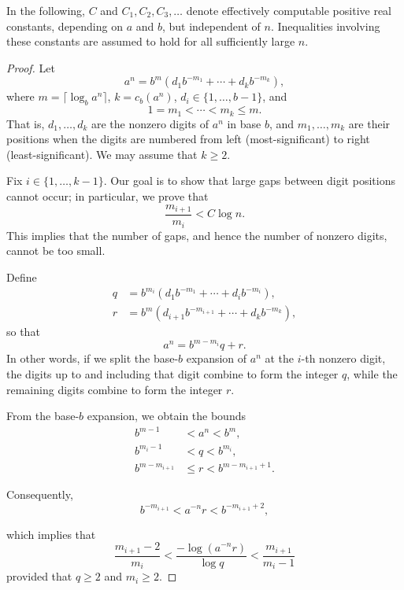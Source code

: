 \documentclass[12pt]{amsart}
\theoremstyle{remark}
\begin{document}
In the following, $C$ and $C_1, C_2, C_3, \ldots$ denote effectively computable positive real constants,
depending on $a$ and $b$, but independent of $n$.
Inequalities involving these constants are assumed to hold for all sufficiently large $n$.

\begin{proof}
    Let
    \[
        a^n = b^m \left(d_1 b^{-m_1} + \cdots + d_k b^{-m_k}\right),
    \]
    where $m = \lceil \log_b a^n \rceil$, $k = c_b(a^n)$,
    $d_i \in \{1, \ldots, b-1\}$,
    and
    \[
        1 = m_1 < \cdots < m_k \le m.
    \]
    That is, $d_1, \ldots, d_k$ are the nonzero digits of $a^n$ in base $b$,
    and $m_1, \ldots, m_k$ are their positions when the digits are numbered
    from left (most-significant) to right (least-significant).
    We may assume that $k \ge 2$.

    Fix $i \in \{1,\dots,k-1\}$.
    Our goal is to show that large gaps between digit positions cannot occur;
    in particular, we prove that
    \[
        \frac{m_{i+1}}{m_i} < C \log n.
    \]
    This implies that the number of gaps,
    and hence the number of nonzero digits, cannot be too small.

    Define
    \begin{align*}\label{ineq:base-b-bounds}
        q & = b^{m_{i}} (d_1 b^{-m_{1}} + \cdots + d_i b^{-m_{i}}), \\
        r & = b^m (d_{i+1} b^{-m_{i+1}} + \cdots + d_k b^{-m_{k}}),
    \end{align*}
    so that
    \[
        a^n = b^{m - m_i} q + r.
    \]
    In other words, if we split the base-$b$ expansion of $a^n$ at the $i$-th nonzero digit,
    the digits up to and including that digit combine to form the integer $q$,
    while the remaining digits combine to form the integer $r$.

    From the base-$b$ expansion, we obtain the bounds
    \begin{align*}
        b^{m-1}       & < a^n  < b^m,             \\
        b^{m_{i}-1}   & < q    < b^{m_i},         \\
        b^{m-m_{i+1}} & \le r  < b^{m-m_{i+1}+1}.
    \end{align*}

    Consequently,
    \begin{equation}\label{ineq:anr-bounds}
        b^{-m_{i+1}} < a^{-n} r < b^{-m_{i+1}+2},
    \end{equation}

    which implies that
    \[
        \frac{m_{i+1} - 2}{m_{i}} <
        \frac{-\log(a^{-n}r)}{\log q} <
        \frac{m_{i+1}}{m_{i} - 1}
    \]
    provided that $q \ge 2$ and $m_i \ge 2$.


\end{proof}
\end{document}
